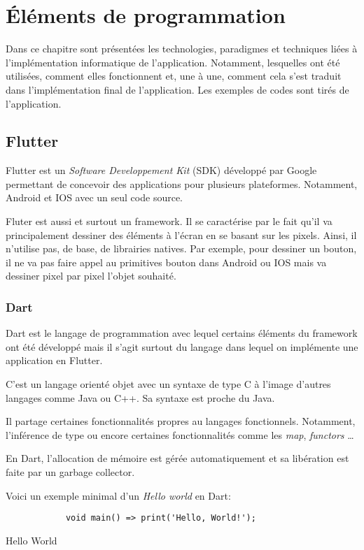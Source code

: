 
\chapter[Éléments de programmation]{Éléments de programmation}
Dans ce chapitre sont présentées les technologies, paradigmes
et techniques liées à l'implémentation informatique de
l'application. Notamment, lesquelles ont été utilisées,
comment elles fonctionnent et, une à une, comment cela
s’est traduit dans l'implémentation final de l'application.
Les exemples de codes sont tirés de l'application.


\section{Flutter}
Flutter est un \textit{Software Developpement Kit} (SDK) développé par Google permettant de concevoir
des applications pour plusieurs plateformes. Notamment, Android et IOS avec un seul code source.

Fluter est aussi et surtout un framework. Il se caractérise par le fait qu'il va principalement dessiner des éléments
à l'écran en se basant sur les pixels. Ainsi, il n'utilise pas, de base, de librairies natives. Par exemple, pour dessiner un
bouton, il ne va pas faire appel au primitives bouton dans Android ou IOS mais va dessiner pixel par pixel
l'objet souhaité.

\subsection{Dart}
Dart est le langage de programmation avec lequel certains éléments du framework ont été développé mais il s'agit
surtout du langage dans lequel on implémente une application en Flutter.

C'est un langage orienté objet avec un syntaxe de type C à l'image d'autres langages comme Java ou C++.
Sa syntaxe est proche du Java.

Il partage certaines fonctionnalités propres au langages fonctionnels. Notamment, l'inférence de type ou encore
certaines fonctionnalités comme les \textit{map}, \textit{functors} \dots

En Dart, l'allocation de mémoire est gérée automatiquement et sa libération est faite par un garbage collector.

Voici un exemple minimal d'un \textit{Hello world} en Dart:
\begin{listing}[!h]
    \begin{verbatim}
            void main() => print('Hello, World!');
    \end{verbatim}
        \caption{Hello World \label{listing:3}}
\end{listing}
\newpage

